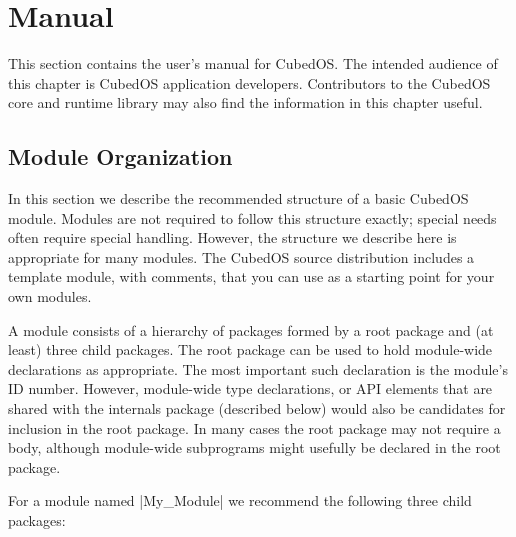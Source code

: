 
\chapter{Manual}
\label{chapt:manual}

This section contains the user's manual for CubedOS. The intended audience of this chapter is
CubedOS application developers. Contributors to the CubedOS core and runtime library may also
find the information in this chapter useful.

\section{Module Organization}
\label{sec:module-organization}

In this section we describe the recommended structure of a basic CubedOS module. Modules are not
required to follow this structure exactly; special needs often require special handling.
However, the structure we describe here is appropriate for many modules. The CubedOS source
distribution includes a template module, with comments, that you can use as a starting point for
your own modules.

A module consists of a hierarchy of packages formed by a root package and (at least) three child
packages. The root package can be used to hold module-wide declarations as appropriate. The most
important such declaration is the module's ID number. However, module-wide type declarations, or
API elements that are shared with the internals package (described below) would also be
candidates for inclusion in the root package. In many cases the root package may not require a
body, although module-wide subprograms might usefully be declared in the root package.

For a module named |My_Module| we recommend the following three child packages:

